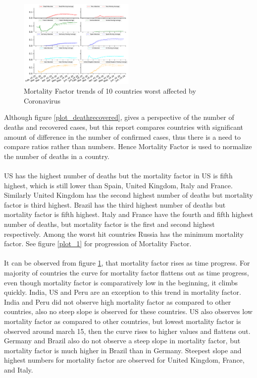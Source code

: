 \documentclass[12pt, twosided]{report}  %
\begin{document}
\begin{figure}[H]
	\centering
	\includegraphics[width=0.5\textwidth]{./images/plot_7.pdf}
	\caption{Mortality Factor trends of 10 countries worst affected by Coronavirus}
	\label{plot_mortalityfactor}
\end{figure}

Although figure \ref{plot_deathrecovered}, gives a perspective of the number of deaths and recovered cases, but this report compares countries with significant amount of difference in the number of confirmed cases, thus there is a need to compare ratios rather than numbers. Hence Mortality Factor is used to normalize the number of deaths in a country.
\\
\\
US has the highest number of deaths but the mortality factor in US is fifth highest, which is still lower than Spain, United Kingdom, Italy and France. Similarly United Kingdom has the second highest number of deaths but mortality factor is third highest. Brazil has the third highest number of deaths but mortality factor is fifth highest. Italy and France have the fourth and fifth highest number of deaths, but mortality factor is the first and second highest respectively. Among the worst hit countries Russia has the minimum mortality factor. See figure \ref{plot_1} for progression of Mortality Factor.
\\
\\
It can be observed from figure \ref{plot_mortalityfactor}, that mortality factor rises as time progress. For majority of countries the curve for mortality factor flattens out as time progress, even though mortality factor is comparatively low in the beginning, it climbs quickly. India, US and Peru are an exception to this trend in mortality factor. India and Peru did not observe high mortality factor as compared to other countries, also no steep slope is observed for these countries. US also observes low mortality factor as compared to other countries, but lowest mortality factor is observed around march 15, then the curve rises to higher values and flattens out. Germany and Brazil also do not observe a steep slope in mortality factor, but mortality factor is much higher in Brazil than in Germany. Steepest slope and highest numbers for mortality factor are observed for United Kingdom, France, and Italy.
\end{document}
